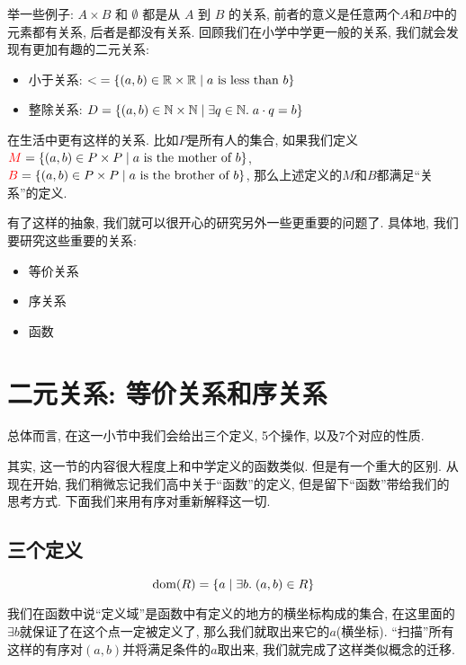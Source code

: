 举一些例子: $A\times B$ 和 $\emptyset$ 都是从 $A$ 到 $B$ 的关系, 前者的意义是任意两个$A$和$B$中的元素都有关系, 后者是都没有关系. 回顾我们在小学中学更一般的关系, 我们就会发现有更加有趣的二元关系: 
\begin{itemize}
  \item 小于关系: $<\; = \{(a, b) \in \mathbb{R} \times \mathbb{R} \mid a \text{ is less than } b\}$
  \item 整除关系: $D = \{(a, b) \in \mathbb{N} \times \mathbb{N} \mid \exists q \in \mathbb{N}.\; a \cdot q = b\}$
\end{itemize}

在生活中更有这样的关系. 比如$P$是所有人的集合, 如果我们定义$\textcolor{red}{M} = \{(a, b) \in P \times P \mid a \text{ is the mother of } b\}$, $\textcolor{red}{B} = \{(a, b) \in P \times P \mid a \text{ is the brother of } b\}$, 那么上述定义的$M$和$B$都满足``关系''的定义.

有了这样的抽象, 我们就可以很开心的研究另外一些更重要的问题了. 具体地, 我们要研究这些重要的关系: 
\begin{itemize}
  \item 等价关系
  \item 序关系
  \item 函数
\end{itemize}


\section{二元关系: 等价关系和序关系}

总体而言, 在这一小节中我们会给出三个定义, 5个操作, 以及7个对应的性质. 

其实, 这一节的内容很大程度上和中学定义的函数类似. 但是有一个重大的区别. 从现在开始, 我们稍微忘记我们高中关于``函数''的定义, 但是留下``函数''带给我们的思考方式. 下面我们来用有序对重新解释这一切. 

\subsection{三个定义}

\begin{definition}
  \[
    \text{dom}(R) = \{a \mid \exists b.\; (a,b) \in R\}
  \]
\end{definition}

我们在函数中说``定义域''是函数中有定义的地方的横坐标构成的集合, 在这里面的$\exists b$就保证了在这个点一定被定义了, 那么我们就取出来它的$a$(横坐标). ``扫描''所有这样的有序对$(a,b)$并将满足条件的$a$取出来, 我们就完成了这样类似概念的迁移. 

